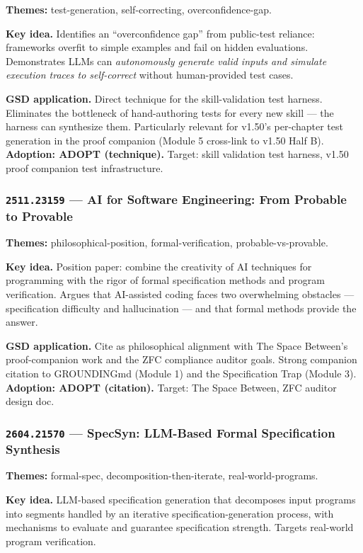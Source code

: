 \documentclass[11pt,letterpaper]{article}
\newcommand{\arxivid}[1]{\texttt{\textcolor{accent}{#1}}}
\newcommand{\paperhead}[2]{\noindent\textbf{\sffamily\textcolor{secondary}{#1}} \textemdash{} #2}
\begin{document}
\paperhead{Themes:}{test-generation, self-correcting, overconfidence-gap.}

\textbf{Key idea.} Identifies an ``overconfidence gap'' from public-test reliance: frameworks overfit to simple examples and fail on hidden evaluations. Demonstrates LLMs can \textit{autonomously generate valid inputs and simulate execution traces to self-correct} without human-provided test cases.

\textbf{GSD application.} Direct technique for the skill-validation test harness. Eliminates the bottleneck of hand-authoring tests for every new skill --- the harness can synthesize them. Particularly relevant for v1.50's per-chapter test generation in the proof companion (Module 5 cross-link to v1.50 Half B). \textbf{Adoption: ADOPT (technique).} Target: skill validation test harness, v1.50 proof companion test infrastructure.

\subsubsection{\arxivid{2511.23159} --- AI for Software Engineering: From Probable to Provable}

\paperhead{Themes:}{philosophical-position, formal-verification, probable-vs-provable.}

\textbf{Key idea.} Position paper: combine the creativity of AI techniques for programming with the rigor of formal specification methods and program verification. Argues that AI-assisted coding faces two overwhelming obstacles --- specification difficulty and hallucination --- and that formal methods provide the answer.

\textbf{GSD application.} Cite as philosophical alignment with The Space Between's proof-companion work and the ZFC compliance auditor goals. Strong companion citation to GROUNDINGmd (Module 1) and the Specification Trap (Module 3). \textbf{Adoption: ADOPT (citation).} Target: The Space Between, ZFC auditor design doc.

\subsubsection{\arxivid{2604.21570} --- SpecSyn: LLM-Based Formal Specification Synthesis}

\paperhead{Themes:}{formal-spec, decomposition-then-iterate, real-world-programs.}

\textbf{Key idea.} LLM-based specification generation that decomposes input programs into segments handled by an iterative specification-generation process, with mechanisms to evaluate and guarantee specification strength. Targets real-world program verification.
\end{document}
